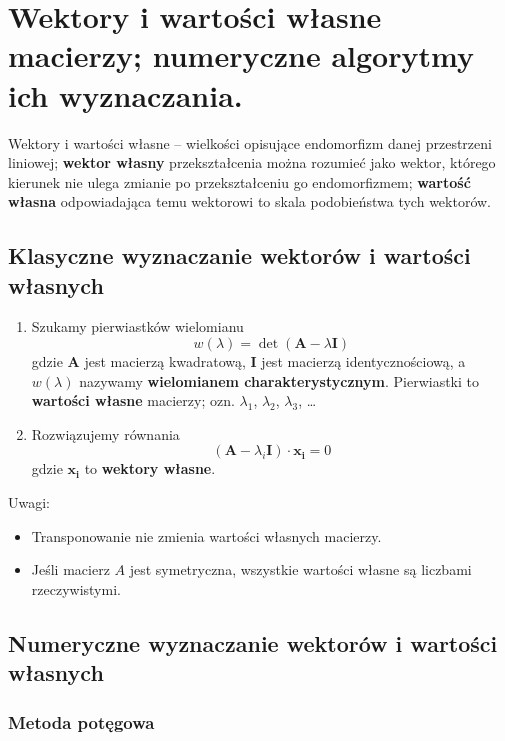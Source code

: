 \section{Wektory i wartości własne macierzy; numeryczne algorytmy ich wyznaczania.}

Wektory i wartości własne – wielkości opisujące endomorfizm danej przestrzeni liniowej;
\textbf{wektor własny} przekształcenia można rozumieć jako wektor,
którego kierunek nie ulega zmianie po przekształceniu go endomorfizmem;
\textbf{wartość własna} odpowiadająca temu wektorowi to skala podobieństwa tych wektorów.

\subsection{Klasyczne wyznaczanie wektorów i wartości własnych}

\begin{enumerate}[itemsep=0pt,partopsep=0pt, parsep=0pt]
    \item Szukamy pierwiastków wielomianu
    \[
        w(\lambda)=\det(\mathbf{A}-\lambda\mathbf{I})
    \]
    gdzie $\mathbf{A}$ jest macierzą kwadratową, $\mathbf{I}$ jest macierzą identycznościową,
    a $w(\lambda)$ nazywamy \textbf{wielomianem charakterystycznym}.
    Pierwiastki to \textbf{wartości własne} macierzy; ozn. $\lambda_1$, $\lambda_2$, $\lambda_3$, \ldots
    \item Rozwiązujemy równania
    \[
        (\mathbf{A}-\lambda_i\mathbf{I})\cdot\mathbf{x_i}=0
    \]
    gdzie $\mathbf{x_i}$ to \textbf{wektory własne}.
\end{enumerate}

Uwagi:
\begin{itemize}[itemsep=0pt,partopsep=0pt, parsep=0pt]
    \item Transponowanie nie zmienia wartości własnych macierzy.
    \item Jeśli macierz $A$ jest symetryczna, wszystkie wartości własne są liczbami rzeczywistymi.
\end{itemize}

\subsection{Numeryczne wyznaczanie wektorów i wartości własnych}

\subsubsection{Metoda potęgowa}


